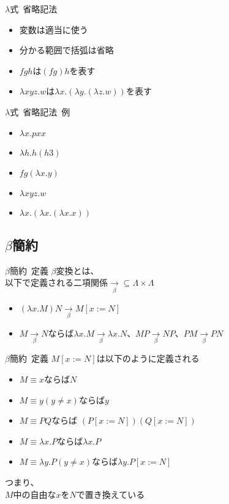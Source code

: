 \documentclass[pdflatex,17pt]{beamer}
\begin{document}
\begin{frame}{$\lambda$式~省略記法}
    \begin{itemize}
        \item 変数は適当に使う
        \item 分かる範囲で括弧は省略
        \item $f g h$は$(f g) h$を表す
        \item $\lambda x y z. w$は$\lambda x. (\lambda y. (\lambda z. w))$を表す
    \end{itemize}
\end{frame}

\begin{frame}{$\lambda$式~省略記法~例}
    \begin{itemize}
        \item $\lambda x. p x x$
        \item $\lambda h. h (h 3)$
        \item $f g (\lambda x. y)$
        \item $\lambda x y z. w$
        \item $\lambda x. (\lambda x. (\lambda x. x))$
    \end{itemize}
\end{frame}

\newcommand{\betato}{\underset{\beta}{\to}}
\newcommand{\betasto}{\underset{\beta}{\twoheadrightarrow}}
\subsection{$\beta$簡約}
\subsectionpage
\begin{frame}{$\beta$簡約~定義}
    $\beta$変換とは、 \\ 以下で定義される二項関係$\betato \subseteq \Lambda \times \Lambda$
    \begin{itemize}
        \item $(\lambda x. M)N \betato M[x:=N]$
        \item $M \betato N$ならば$\lambda x. M \betato \lambda x. N$、$MP \betato NP$、$PM \betato PN$
    \end{itemize}
\end{frame}

\begin{frame}{$\beta$簡約~定義}
    $M[x:=N]$は以下のように定義される
    \begin{itemize}
        \item $M \equiv x$ならば$N$
        \item $M \equiv y (y \neq x)$ならば$y$
        \item $M \equiv PQ$ならば $(P[x:=N])(Q[x:=N])$
        \item $M \equiv \lambda x. P$ならば$\lambda x. P$
        \item $M \equiv \lambda y. P (y \neq x)$ならば$\lambda y. P[x:=N]$
    \end{itemize}
    つまり、 \\ $M$中の自由な$x$を$N$で置き換えている
\end{frame}
\end{document}
